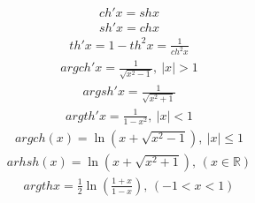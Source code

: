 \documentclass[letterpaper,10pt,french]{jupyterBook}
\begin{document}
\begin{equation*}
\begin{split}
ch'x=shx
\end{split}
\end{equation*}\begin{equation*}
\begin{split}
sh'x=chx
\end{split}
\end{equation*}\begin{equation*}
\begin{split}
th'x=1-th^2 x=\frac{1}{ch^2 x}
\end{split}
\end{equation*}\begin{equation*}
\begin{split}
argch'x=\frac{1}{\sqrt{x^2-1}},\:|x|>1
\end{split}
\end{equation*}\begin{equation*}
\begin{split}
argsh'x=\frac{1}{\sqrt{x^2+1}}
\end{split}
\end{equation*}\begin{equation*}
\begin{split}
argth'x=\frac{1}{1-x^2},\:|x|<1
\end{split}
\end{equation*}\begin{equation*}
\begin{split}
argch(x)=\ln(x+\sqrt{x^2-1}),\:|x|\leq 1
\end{split}
\end{equation*}\begin{equation*}
\begin{split}
arhsh(x)=\ln(x+\sqrt{x^2+1}),\,(x\in\mathbb{R})
\end{split}
\end{equation*}\begin{equation*}
\begin{split}
argthx=\frac{1}{2}\ln(\frac{1+x}{1-x}),\,(-1<x<1)
\end{split}
\end{equation*}
\end{document}
